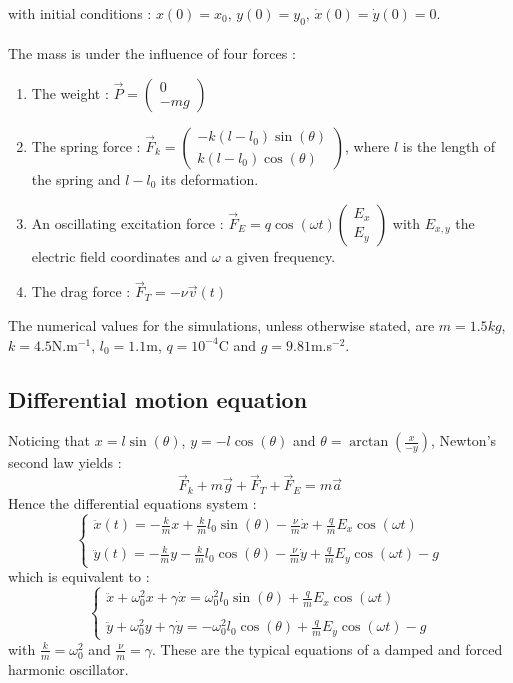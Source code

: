 with initial conditions : $x(0)=x_0,\,y(0)=y_0,\,\dot{x}(0)=\dot{y}(0)=0$.\\ \\
The mass is under the influence of four forces :
\begin{enumerate}
    \item The weight : $\Vec{P}= \begin{pmatrix} 0\\-mg \end{pmatrix}$
    \item The spring force : $\Vec{F}_k= \begin{pmatrix} -k(l-l_0)\sin(\theta)\\k(l-l_0)\cos(\theta) \end{pmatrix}$, where $l$ is the length of the spring and $l-l_0$ its deformation.
    \item An oscillating excitation force : $\Vec{F}_E=q\cos(\omega t) \begin{pmatrix} E_x\\E_y \end{pmatrix}$ with $E_{x,y}$ the electric field coordinates and $\omega$ a given frequency.
    \item The drag force : $\Vec{F}_T= -\nu\Vec{v}(t)$
\end{enumerate}
The numerical values for the simulations, unless otherwise stated, are $m=1.5kg$, $k=4.5$N.m$^{-1}$, $l_0=1.1$m, $q=10^{-4}$C and $g=9.81$m.s$^{-2}$.


\subsection{Differential motion equation}
	Noticing that $x=l\sin(\theta)$, $y=-l\cos(\theta)$ and $\theta=				\arctan(\frac{x}{-y})$, Newton's second law yields :
	\begin{equation}
	\vec{F}_k + m\vec{g} + \vec{F}_T + \vec{F}_E = m\vec{a}
	\end{equation}
	Hence the differential equations system :
	\begin{equation}	 
	\left\{
	\begin{array}{l}
		\ddot{x}(t)= -\frac{k}{m}x + \frac{k}{m}l_0\sin(\theta) - \frac{\nu}			{m}\dot{x} + \frac{q}{m}E_x\cos(\omega t) \\ \\
		\ddot{y}(t)= -\frac{k}{m}y - \frac{k}{m}l_0\cos(\theta) - \frac{\nu}			{m}\dot{y} + \frac{q}{m}E_y\cos(\omega t)-g
	\end{array}	
	\right.	 
	\end{equation}
	which is equivalent to :
	\begin{equation}	 
	\left\{
	\begin{array}{l}
		\ddot{x}+\omega_0^2x+\gamma\dot{x}= \omega_0^2l_0\sin(\theta)+					\frac{q}{m}E_x\cos(\omega t) \\ \\
		\ddot{y}+\omega_0^2y +\gamma\dot{y}= - \omega_0^2l_0\cos(\theta) + 				\frac{q}{m}E_y\cos(\omega t)-g
	\end{array}	
	\right.	 
	\end{equation}
	with $\frac{k}{m}=\omega_0^2$ and $\frac{\nu}{m}=\gamma$. These are the 		typical equations of a damped and forced harmonic oscillator.
	

